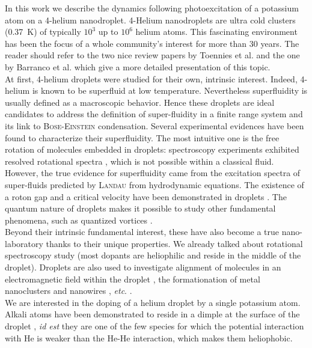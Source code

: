 
In this work we describe the dynamics following photoexcitation of a potassium atom on a 4-helium nanodroplet.
4-Helium nanodroplets are ultra cold clusters (0.37~K) of typically $10^3$ up to $10^6$ helium atoms. 
This fascinating environment has been the focus of a whole community's interest for more than 30 years.
The reader should refer to the two nice review papers by Toennies et al. \cite{Toe2001, Toe2004} and the one by Barranco et al. \cite{Bar2006} which give a more detailed presentation of this topic.\\

At first, 4-helium droplets were studied for their own, intrinsic interest. 
Indeed, 4-helium is known to be superfluid at low temperature. 
Nevertheless superfluidity is usually defined as a macroscopic behavior. 
Hence these droplets are ideal candidates to address the definition of super-fluidity in a finite range system and its link to \textsc{Bose-Einstein} condensation. 
Several experimental evidences have been found to characterize their superfluidity.
The most intuitive one is the free rotation of molecules embedded in droplets: spectroscopy experiments exhibited resolved rotational spectra \cite{Har1995}, which is not possible within a classical fluid. 
However, the true evidence for superfluidity came from the excitation spectra of super-fluids predicted by \textsc{Landau} from hydrodynamic equations.
The existence of a roton gap and a critical velocity have been demonstrated in droplets \cite{Gre2000}. 
The quantum nature of droplets makes it possible to study other fundamental phenomena, such as quantized vortices \cite{Gom2014,Anc2017}. \\

Beyond their intrinsic fundamental interest, these have also become a true nano-laboratory thanks to their unique properties. 
We already talked about rotational spectroscopy study (most dopants are heliophilic and reside in the middle of the droplet). 
Droplets are also used to investigate alignment of molecules in an electromagnetic field within the droplet \cite{Mer2016,She2017}, the formationation of metal nanoclusters and nanowires \cite{Vol2016}, \textit{etc}. \cite{Toe2001, Toe2004}.\\

We are interested in the doping of a helium droplet by a single potassium atom. 
Alkali atoms have been demonstrated to reside in a dimple at the surface of the droplet \cite{Hig1998}, \textit{id est} they are one of the few species for which the potential interaction with He is weaker than the He-He interaction, which makes them heliophobic.\\

